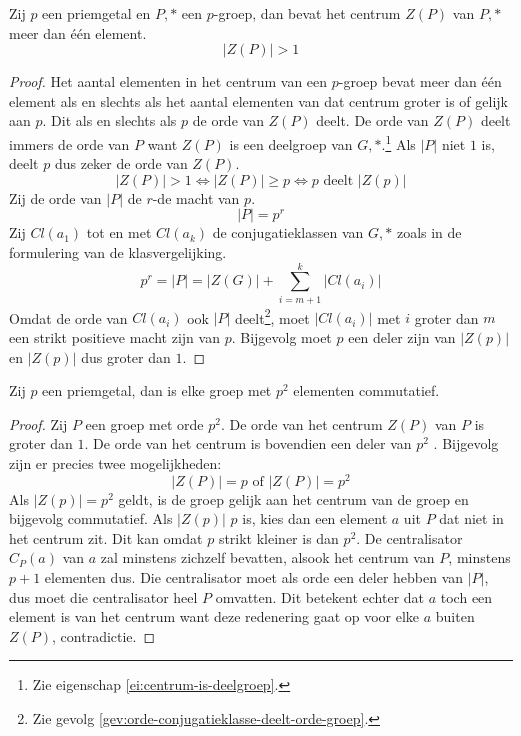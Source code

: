 \documentclass[main.tex]{subfiles}
\begin{document}
\begin{pr}
  \label{pr:orde-centrum-pgroep-groter-dan-een}
  Zij $p$ een priemgetal en $P,*$ een $p$-groep, dan bevat het centrum $Z(P)$ van $P,*$ meer dan \'e\'en element.
  \[ |Z(P)| > 1 \]
  
  \begin{proof}
    Het aantal elementen in het centrum van een $p$-groep bevat meer dan \'e\'en element als en slechts als het aantal elementen van dat centrum groter is of gelijk aan $p$.
    Dit als en slechts als $p$ de orde van $Z(P)$ deelt.
    De orde van $Z(P)$ deelt immers de orde van $P$ want $Z(P)$ is een deelgroep van $G,*$.\footnote{Zie eigenschap \ref{ei:centrum-is-deelgroep}.} 
    Als $|P|$ niet $1$ is, deelt $p$ dus zeker de orde van $Z(P)$.
    \[ |Z(P)| > 1 \Leftrightarrow |Z(P)| \ge p \Leftrightarrow p \text{ deelt } |Z(p)| \]
    Zij de orde van $|P|$ de $r$-de macht van $p$.
    \[ |P| = p^{r} \]
    Zij $Cl(a_{1})$ tot en met $Cl(a_{k})$ de conjugatieklassen van $G,*$ zoals in de formulering van de klasvergelijking.
    \[ p^{r} = |P| = |Z(G)| + \sum_{i=m+1}^{k}|Cl(a_{i})| \]
    Omdat de orde van $Cl(a_{i})$ ook $|P|$ deelt\footnote{Zie gevolg \ref{gev:orde-conjugatieklasse-deelt-orde-groep}.}, moet $|Cl(a_{i})|$ met $i$ groter dan $m$ een strikt positieve macht zijn van $p$.
    Bijgevolg moet $p$ een deler zijn van $|Z(p)|$  en $|Z(p)|$ dus groter dan $1$.
  \end{proof}
\end{pr}


\begin{st}
  \label{st:priemgroep-kwadraat-abels}
  Zij $p$ een priemgetal, dan is elke groep met $p^{2}$ elementen commutatief.

  \begin{proof}
    Zij $P$ een groep met orde $p^{2}$.
    De orde van het centrum $Z(P)$ van $P$ is groter dan $1$.
    De orde van het centrum is bovendien een deler van $p^{2}$ .
    Bijgevolg zijn er precies twee mogelijkheden:
    \[ |Z(P)| = p \text { of } |Z(P)| = p^{2} \]
    Als $|Z(p)| = p^{2}$ geldt, is de groep gelijk aan het centrum van de groep en bijgevolg commutatief.
    Als $|Z(p)|$ $p$ is, kies dan een element $a$ uit $P$ dat niet in het centrum zit. Dit kan omdat $p$ strikt kleiner is dan $p^{2}$.
    De centralisator $C_{P}(a)$ van $a$ zal minstens zichzelf bevatten, alsook het centrum van $P$, minstens $p+1$ elementen dus.
    Die centralisator moet als orde een deler hebben van $|P|$,  dus moet die centralisator heel $P$ omvatten.
    Dit betekent echter dat $a$ toch een element is van het centrum want deze redenering gaat op voor elke $a$ buiten $Z(P)$, contradictie. 
  \end{proof}
\end{st}
\end{document}
